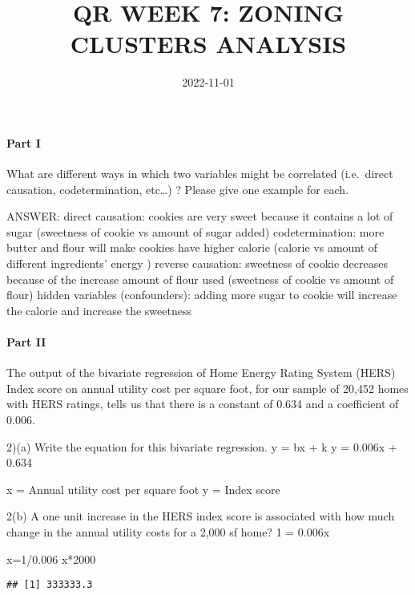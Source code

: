\documentclass[
]{article}
\title{QR WEEK 7: ZONING CLUSTERS ANALYSIS}
\author{}
\date{\vspace{-2.5em}2022-11-01}
\newenvironment{Shaded}{\begin{snugshade}}{\end{snugshade}}
\newcommand{\DecValTok}[1]{\textcolor[rgb]{0.00,0.00,0.81}{#1}}
\newcommand{\FloatTok}[1]{\textcolor[rgb]{0.00,0.00,0.81}{#1}}
\newcommand{\NormalTok}[1]{#1}
\newcommand{\OtherTok}[1]{\textcolor[rgb]{0.56,0.35,0.01}{#1}}
\newcommand{\SpecialCharTok}[1]{\textcolor[rgb]{0.00,0.00,0.00}{#1}}
\begin{document}
\maketitle

\hypertarget{part-i}{%
\paragraph{Part I}\label{part-i}}

What are different ways in which two variables might be correlated
(i.e.~direct causation, codetermination, etc\ldots) ? Please give one
example for each.

ANSWER: direct causation: cookies are very sweet because it contains a
lot of sugar (sweetness of cookie vs amount of sugar added)
codetermination: more butter and flour will make cookies have higher
calorie (calorie vs amount of different ingredients' energy ) reverse
causation: sweetness of cookie decreases because of the increase amount
of flour used (sweetness of cookie vs amount of flour) hidden variables
(confounders): adding more sugar to cookie will increase the calorie and
increase the sweetness

\hypertarget{part-ii}{%
\paragraph{Part II}\label{part-ii}}

The output of the bivariate regression of Home Energy Rating System
(HERS) Index score on annual utility cost per square foot, for our
sample of 20,452 homes with HERS ratings, tells us that there is a
constant of 0.634 and a coefficient of 0.006.

2)(a) Write the equation for this bivariate regression. y = bx + k y =
0.006x + 0.634

x = Annual utility cost per square foot y = Index score

2(b) A one unit increase in the HERS index score is associated with how
much change in the annual utility costs for a 2,000 sf home? 1 = 0.006x

\begin{Shaded}
\begin{Highlighting}[]
\NormalTok{x}\OtherTok{=}\DecValTok{1}\SpecialCharTok{/}\FloatTok{0.006}
\NormalTok{x}\SpecialCharTok{*}\DecValTok{2000}
\end{Highlighting}
\end{Shaded}

\begin{verbatim}
## [1] 333333.3
\end{verbatim}
\end{document}
